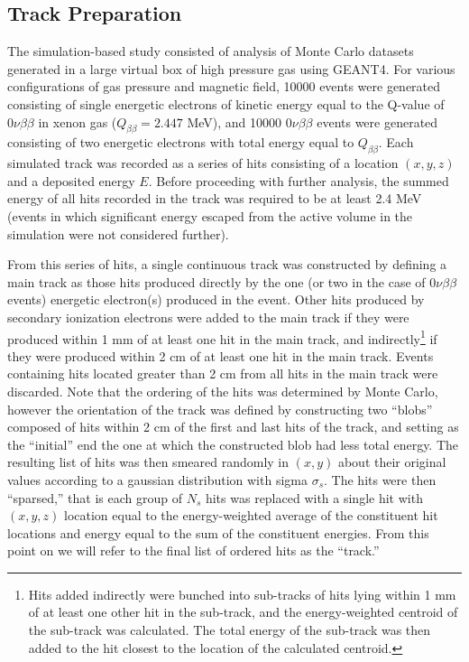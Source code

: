 \documentclass{JINST}
\begin{document}
\subsection{Track Preparation}\label{ssec:track}
The simulation-based study consisted of analysis of Monte Carlo datasets generated in a large virtual box of high pressure gas using GEANT4.  For various configurations of gas pressure and magnetic field, 10000 events were generated consisting of single energetic electrons of kinetic energy equal to the Q-value of $0\nu\beta\beta$ in xenon gas ($Q_{\beta\beta} = 2.447$ MeV), and 10000 $0\nu\beta\beta$ events were generated consisting of two energetic electrons with total energy equal to $Q_{\beta\beta}$.  Each simulated track was recorded as a series of hits consisting of a location $(x,y,z)$ and a deposited energy $E$.  Before proceeding with further analysis, the summed energy of all hits recorded in the track was required to be at least 2.4 MeV (events in which significant energy escaped from the active volume in the simulation were not considered further).

From this series of hits, a single continuous track was constructed by defining a main track as those hits produced directly by the one (or two in the case of $0\nu\beta\beta$ events) energetic electron(s) produced in the event.  Other hits produced by secondary ionization electrons were added to the main track if they were produced within 1 mm of at least one hit in the main track, and indirectly\footnote{Hits added indirectly were bunched into sub-tracks of hits lying within 1 mm of at least one other hit in the sub-track, and the energy-weighted centroid of the sub-track was calculated.  The total energy of the sub-track was then added to the hit closest to the location of the calculated centroid.} if they were produced within 2 cm of at least one hit in the main track.  Events containing hits located greater than 2 cm from all hits in the main track were discarded.  Note that the ordering of the hits was determined by Monte Carlo, however the orientation of the track was defined by constructing two ``blobs'' composed of hits within 2 cm of the first and last hits of the track, and setting as the ``initial'' end the one at which the constructed blob had less total energy.  The resulting list of hits was then smeared randomly in $(x,y)$ about their original values according to a gaussian distribution with sigma $\sigma_{s}$.  The hits were then ``sparsed,'' that is each group of $N_{s}$ hits was replaced with a single hit with $(x,y,z)$ location equal to the energy-weighted average of the constituent hit locations and energy equal to the sum of the constituent energies.  From this point on we will refer to the final list of ordered hits as the ``track.''
\end{document}
